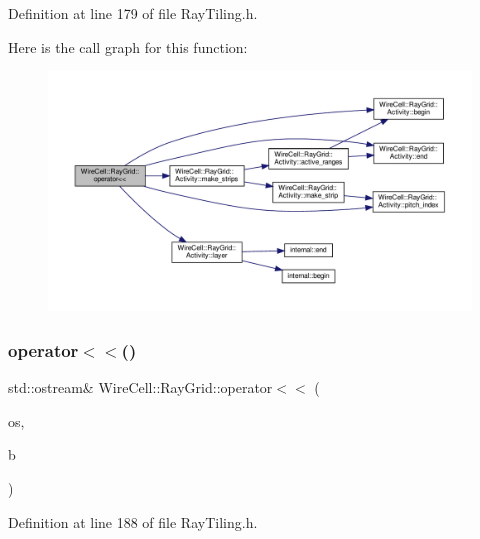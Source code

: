 Definition at line 179 of file Ray\+Tiling.\+h.

Here is the call graph for this function\+:
\nopagebreak
\begin{figure}[H]
\begin{center}
\leavevmode
\includegraphics[width=350pt]{namespace_wire_cell_1_1_ray_grid_ab7bb8eba0ead6662043107193ad27361_cgraph}
\end{center}
\end{figure}
\mbox{\label{namespace_wire_cell_1_1_ray_grid_ae5aa7f167da146b7a3c08802424cdd4a}} 
\subsubsection{\texorpdfstring{operator$<$$<$()}{operator<<()}\hspace{0.1cm}{\footnotesize\ttfamily [4/5]}}
{\footnotesize\ttfamily std\+::ostream\& Wire\+Cell\+::\+Ray\+Grid\+::operator$<$$<$ (\begin{DoxyParamCaption}\item[{std\+::ostream \&}]{os,  }\item[{const \hyperlink{class_wire_cell_1_1_ray_grid_1_1_blob}{Wire\+Cell\+::\+Ray\+Grid\+::\+Blob} \&}]{b }\end{DoxyParamCaption})\hspace{0.3cm}{\ttfamily [inline]}}



Definition at line 188 of file Ray\+Tiling.\+h.

